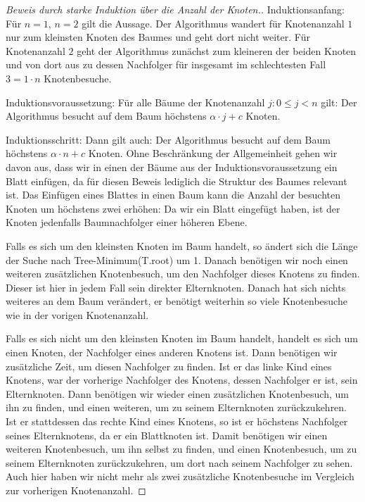 \documentclass{scrartcl} %
\begin{document}
\begin{aufgabe}
\begin{enumerate}[label=(\alph*)]
            \begin{proof}[Beweis durch starke Induktion über die Anzahl der Knoten.]
                Induktionsanfang: Für $n = 1$, $n = 2$ gilt die Aussage. Der Algorithmus wandert für Knotenanzahl $1$ nur zum kleinsten Knoten des Baumes und geht dort nicht weiter. Für Knotenanzahl $2$ geht der Algorithmus zunächst zum kleineren der beiden Knoten und von dort aus zu dessen Nachfolger für insgesamt im schlechtesten Fall $3 = 1\cdot n$ Knotenbesuche.

                Induktionsvoraussetzung: Für alle Bäume der Knotenanzahl $j: 0 \leq j < n$ gilt: Der Algorithmus besucht auf dem Baum höchstens $\alpha\cdot j + c$ Knoten.

                Induktionsschritt: Dann gilt auch: Der Algorithmus besucht auf dem Baum höchstens $\alpha\cdot n + c$ Knoten. Ohne Beschränkung der Allgemeinheit gehen wir davon aus, dass wir in einen der Bäume aus der Induktionsvoraussetzung ein Blatt einfügen, da für diesen Beweis lediglich die Struktur des Baumes relevant ist. Das Einfügen eines Blattes in einen Baum kann die Anzahl der besuchten Knoten um höchstens zwei erhöhen: Da wir ein Blatt eingefügt haben, ist der Knoten jedenfalls Baumnachfolger einer höheren Ebene. 
                
                Falls es sich um den kleinsten Knoten im Baum handelt, so ändert sich die Länge der Suche nach {\ttfamily Tree-Minimum(T.root)} um 1. Danach benötigen wir noch einen weiteren zusätzlichen Knotenbesuch, um den Nachfolger dieses Knotens zu finden. Dieser ist hier in jedem Fall sein direkter Elternknoten. Danach hat sich nichts weiteres an dem Baum verändert, er benötigt weiterhin so viele Knotenbesuche wie in der vorigen Knotenanzahl.

                Falls es sich nicht um den kleinsten Knoten im Baum handelt, handelt es sich um einen Knoten, der Nachfolger eines anderen Knotens ist. Dann benötigen wir zusätzliche Zeit, um diesen Nachfolger zu finden. Ist er das linke Kind eines Knotens, war der vorherige Nachfolger des Knotens, dessen Nachfolger er ist, sein Elternknoten. Dann benötigen wir wieder einen zusätzlichen Knotenbesuch, um ihn zu finden, und einen weiteren, um zu seinem Elternknoten zurückzukehren. Ist er stattdessen das rechte Kind eines Knotens, so ist er höchstens Nachfolger seines Elternknotens, da er ein Blattknoten ist. Damit benötigen wir einen weiteren Knotenbesuch, um ihn selbst zu finden, und einen Knotenbesuch, um zu seinem Elternknoten zurückzukehren, um dort nach seinem Nachfolger zu sehen. Auch hier haben wir nicht mehr als zwei zusätzliche Knotenbesuche im Vergleich zur vorherigen Knotenanzahl.
            \end{proof}
        \end{enumerate}
    \end{aufgabe}
\end{document}
